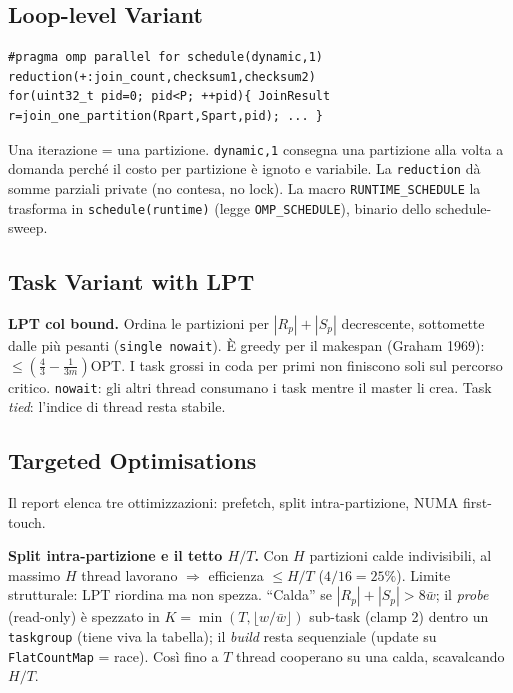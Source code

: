 \documentclass[11pt,a4paper]{article}
\begin{document}
\subsection{Loop-level Variant}

\begin{lstlisting}[style=cpp]
#pragma omp parallel for schedule(dynamic,1) reduction(+:join_count,checksum1,checksum2)
for(uint32_t pid=0; pid<P; ++pid){ JoinResult r=join_one_partition(Rpart,Spart,pid); ... }
\end{lstlisting}

\begin{motiv}
Una iterazione = una partizione. \texttt{dynamic,1} consegna una partizione alla volta a domanda perché il costo per partizione è ignoto e variabile. La \texttt{reduction} dà somme parziali private (no contesa, no lock). La macro \texttt{RUNTIME\_SCHEDULE} la trasforma in \texttt{schedule(runtime)} (legge \texttt{OMP\_SCHEDULE}), binario dello schedule-sweep.
\end{motiv}

\subsection{Task Variant with LPT}

\begin{deriv}
\textbf{LPT col bound.} Ordina le partizioni per $|R_p|+|S_p|$ decrescente, sottomette dalle più pesanti (\texttt{single nowait}). È greedy per il makespan (Graham 1969): $\le(\tfrac43-\tfrac{1}{3m})\text{OPT}$. I task grossi in coda per primi non finiscono soli sul percorso critico. \texttt{nowait}: gli altri thread consumano i task mentre il master li crea. Task \emph{tied}: l'indice di thread resta stabile.
\end{deriv}

\subsection{Targeted Optimisations}

Il report elenca tre ottimizzazioni: prefetch, split intra-partizione, NUMA first-touch.

\begin{deriv}
\textbf{Split intra-partizione e il tetto $H/T$.} Con $H$ partizioni calde indivisibili, al massimo $H$ thread lavorano $\Rightarrow$ efficienza $\le H/T$ ($4/16=25\%$). Limite strutturale: LPT riordina ma non spezza. ``Calda'' se $|R_p|+|S_p|>8\bar w$; il \emph{probe} (read-only) è spezzato in $K=\min(T,\lfloor w/\bar w\rfloor)$ sub-task (clamp 2) dentro un \texttt{taskgroup} (tiene viva la tabella); il \emph{build} resta sequenziale (update su \texttt{FlatCountMap} = race). Così fino a $T$ thread cooperano su una calda, scavalcando $H/T$.
\end{deriv}
\end{document}
